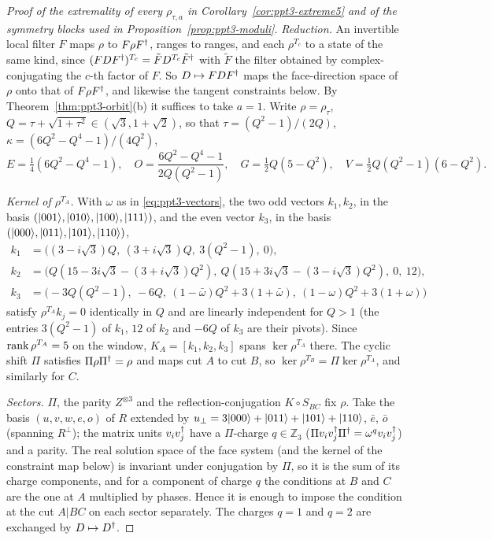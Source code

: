 \begin{proof}[Proof of the extremality of every $\rho_{\tau,a}$ in Corollary~\ref{cor:ppt3-extreme5} and of the symmetry blocks used in Proposition~\ref{prop:ppt3-moduli}]
\emph{Reduction.} An invertible local filter $F$ maps $\rho$ to $F\rho F^{\dagger}$, ranges to ranges, and each $\rho^{T_c}$ to a state
of the same kind, since $(FDF^{\dagger})^{T_c}=\tilde FD^{T_c}\tilde F^{\dagger}$ with $\tilde F$ the filter obtained by complex-conjugating the $c$-th
factor of $F$. So $D\mapsto FDF^{\dagger}$ maps the face-direction space of $\rho$ onto that of $F\rho F^{\dagger}$, and likewise the tangent
constraints below. By Theorem~\ref{thm:ppt3-orbit}(b) it suffices to take $a=1$. Write $\rho=\rho_\tau$, $Q=\tau+\sqrt{1+\tau^2}\in(\sqrt3,1+\sqrt2)$, so that
$\tau=(Q^2-1)/(2Q)$, $\kappa=(6Q^2-Q^4-1)/(4Q^2)$,
\[
E=\tfrac14(6Q^2-Q^4-1),\quad O=\frac{6Q^2-Q^4-1}{2Q(Q^2-1)},\quad G=\tfrac12Q(5-Q^2),\quad V=\tfrac12Q(Q^2-1)(6-Q^2).
\]

\emph{Kernel of $\rho^{T_A}$.} With $\omega$ as in \eqref{eq:ppt3-vectors}, the two odd vectors $k_1,k_2$, in the basis
$(\lvert001\rangle,\lvert010\rangle,\lvert100\rangle,\lvert111\rangle)$, and the even vector $k_3$, in the basis $(\lvert000\rangle,\lvert011\rangle,\lvert101\rangle,\lvert110\rangle)$,
\begin{align*}
k_1&=\bigl((3-i\sqrt3)Q,\ (3+i\sqrt3)Q,\ 3(Q^2-1),\ 0\bigr),\\
k_2&=\bigl(Q(15-3i\sqrt3-(3+i\sqrt3)Q^2),\ Q(15+3i\sqrt3-(3-i\sqrt3)Q^2),\ 0,\ 12\bigr),\\
k_3&=\bigl(-3Q(Q^2-1),\ -6Q,\ (1-\bar\omega)Q^2+3(1+\bar\omega),\ (1-\omega)Q^2+3(1+\omega)\bigr)
\end{align*}
satisfy $\rho^{T_A}k_j=0$ identically in $Q$ and are linearly independent for $Q>1$ (the entries $3(Q^2-1)$ of $k_1$, $12$ of $k_2$ and $-6Q$ of $k_3$ are
their pivots). Since $\operatorname{rank}\rho^{T_A}=5$ on the window, $K_A=[k_1,k_2,k_3]$ spans $\ker\rho^{T_A}$ there. The cyclic shift $\Pi$ satisfies
$\Pi\rho\Pi^{\dagger}=\rho$ and maps cut $A$ to cut $B$, so $\ker\rho^{T_B}=\Pi\ker\rho^{T_A}$, and similarly for $C$.

\emph{Sectors.} $\Pi$, the parity $Z^{\otimes3}$ and the reflection-conjugation $K\circ S_{BC}$ fix $\rho$. Take the basis
$(u,v,w,e,o)$ of $R$ extended by $u_\perp=3\lvert000\rangle+\lvert011\rangle+\lvert101\rangle+\lvert110\rangle$, $\bar e$, $\bar o$ (spanning $R^\perp$); the matrix units $v_iv_j^{\dagger}$ have a $\Pi$-charge
$q\in\mathbb Z_3$ ($\Pi v_iv_j^{\dagger}\Pi^{\dagger}=\omega^qv_iv_j^{\dagger}$) and a parity. The real solution space of the face system (and the kernel of the
constraint map below) is invariant under conjugation by $\Pi$, so it is the sum of its charge components, and for a component of charge $q$ the conditions at
$B$ and $C$ are the one at $A$ multiplied by phases. Hence it is enough to impose the condition at the cut $A|BC$ on each sector
separately. The charges $q=1$ and $q=2$ are exchanged by $D\mapsto D^{\dagger}$.


\end{proof}
